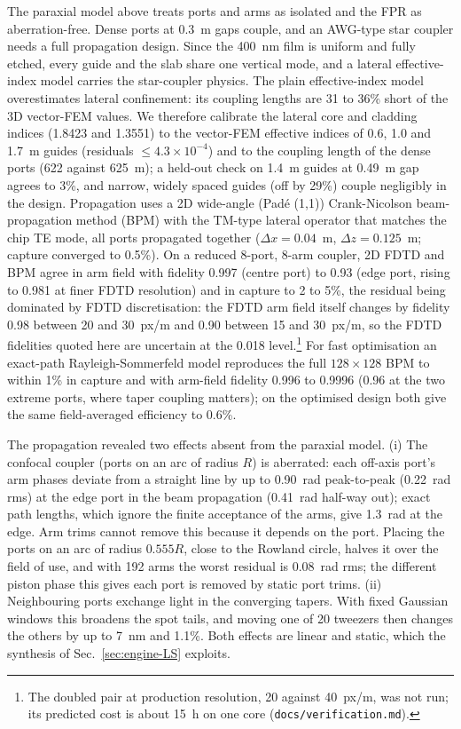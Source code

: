 The paraxial model above treats ports and arms as isolated and the FPR as aberration-free. Dense ports at 0.3~\textmu m gaps couple, and an AWG-type star coupler needs a full propagation design. Since the 400~nm film is uniform and fully etched, every guide and the slab share one vertical mode, and a lateral effective-index model carries the star-coupler physics. The plain effective-index model overestimates lateral confinement: its coupling lengths are 31 to 36\% short of the 3D vector-FEM values. We therefore calibrate the lateral core and cladding indices (1.8423 and 1.3551) to the vector-FEM effective indices of 0.6, 1.0 and 1.7~\textmu m guides (residuals $\le 4.3\times10^{-4}$) and to the coupling length of the dense ports (622 against 625~\textmu m); a held-out check on 1.4~\textmu m guides at 0.49~\textmu m gap agrees to 3\%, and narrow, widely spaced guides (off by 29\%) couple negligibly in the design. Propagation uses a 2D wide-angle (Pad\'e (1,1)) Crank-Nicolson beam-propagation method (BPM) with the TM-type lateral operator that matches the chip TE mode, all ports propagated together ($\Delta x = 0.04$~\textmu m, $\Delta z = 0.125$~\textmu m; capture converged to 0.5\%). On a reduced 8-port, 8-arm coupler, 2D FDTD and BPM agree in arm field with fidelity 0.997 (centre port) to 0.93 (edge port, rising to 0.981 at finer FDTD resolution) and in capture to 2 to 5\%, the residual being dominated by FDTD discretisation: the FDTD arm field itself changes by fidelity 0.98 between 20 and 30~px/\textmu m and 0.90 between 15 and 30~px/\textmu m, so the FDTD fidelities quoted here are uncertain at the 0.018 level.\footnote{The doubled pair at production resolution, 20 against 40~px/\textmu m, was not run; its predicted cost is about 15~h on one core (\texttt{docs/\allowbreak verification.md}).} For fast optimisation an exact-path Rayleigh-Sommerfeld model reproduces the full $128\times128$ BPM to within 1\% in capture and with arm-field fidelity 0.996 to 0.9996 (0.96 at the two extreme ports, where taper coupling matters); on the optimised design both give the same field-averaged efficiency to 0.6\%.

The propagation revealed two effects absent from the paraxial model. (i) The confocal coupler (ports on an arc of radius $R$) is aberrated: each off-axis port's arm phases deviate from a straight line by up to 0.90~rad peak-to-peak (0.22~rad rms) at the edge port in the beam propagation (0.41~rad half-way out); exact path lengths, which ignore the finite acceptance of the arms, give 1.3~rad at the edge. Arm trims cannot remove this because it depends on the port. Placing the ports on an arc of radius $0.555R$, close to the Rowland circle, halves it over the field of use, and with 192 arms the worst residual is 0.08~rad rms; the different piston phase this gives each port is removed by static port trims. (ii) Neighbouring ports exchange light in the converging tapers. With fixed Gaussian windows this broadens the spot tails, and moving one of 20 tweezers then changes the others by up to 7~nm and 1.1\%. Both effects are linear and static, which the synthesis of Sec.~\ref{sec:engine-LS} exploits.

